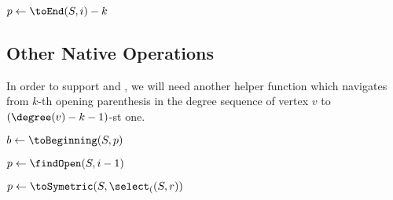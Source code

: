 \begin{algorithm}
\begin{algorithmic}
	\State $p \gets \toEnd(S, i) - k$
	\State {}
\EndFunction
\end{algorithmic}
\end{algorithm}

\subsection{Other Native Operations}

\begin{algorithm}
\begin{algorithmic}
	\State {}
\EndFunction
\end{algorithmic}
\end{algorithm}

\begin{algorithm}
\begin{algorithmic}
	\State {}
\EndFunction
\end{algorithmic}
\end{algorithm}

In order to support \dfudsRank{} and \dfudsSelect{}, we will need another helper function \toSymetric{} which navigates from $k$-th opening parenthesis in the degree sequence of vertex $v$ to $(\degree(v) - k - 1)$-st one.

\begin{algorithm}
\begin{algorithmic}
	\State $b \gets \toBeginning(S, p)$
	\State {}
\EndFunction
\end{algorithmic}
\end{algorithm}

\begin{algorithm}
\begin{algorithmic}
		\State {}
	\Else
		\State $p \gets \findOpen(S, i - 1)$
		\State {}
	\EndIf
\EndFunction
\end{algorithmic}
\end{algorithm}

\begin{algorithm}
\begin{algorithmic}
		\State {}
	\Else
		\State $p \gets \toSymetric(S, \select_((S, r))$
		\State {}
	\EndIf
\EndFunction
\end{algorithmic}
\end{algorithm}

